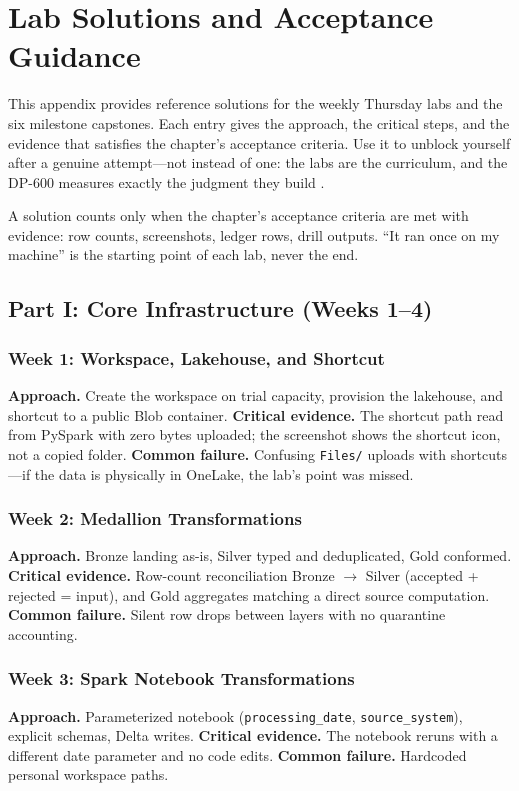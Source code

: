 \chapter{Lab Solutions and Acceptance Guidance}
%
This appendix provides reference solutions for the weekly Thursday labs and the six milestone
capstones. Each entry gives the approach, the critical steps, and the evidence that satisfies the
chapter's acceptance criteria. Use it to unblock yourself after a genuine attempt---not instead
of one: the labs are the curriculum, and the DP-600 measures exactly the judgment they build
\cite{microsoftDp600}.

\begin{notebox}
A solution counts only when the chapter's acceptance criteria are met with evidence: row counts,
screenshots, ledger rows, drill outputs. ``It ran once on my machine'' is the starting point of
each lab, never the end.
\end{notebox}

\section{Part I: Core Infrastructure (Weeks 1--4)}
\subsection{Week 1: Workspace, Lakehouse, and Shortcut}
\textbf{Approach.} Create the workspace on trial capacity, provision the lakehouse, and shortcut
to a public Blob container. \textbf{Critical evidence.} The shortcut path read from PySpark with
zero bytes uploaded; the screenshot shows the shortcut icon, not a copied folder.
\textbf{Common failure.} Confusing \texttt{Files/} uploads with shortcuts---if the data is
physically in OneLake, the lab's point was missed.

\subsection{Week 2: Medallion Transformations}
\textbf{Approach.} Bronze landing as-is, Silver typed and deduplicated, Gold conformed.
\textbf{Critical evidence.} Row-count reconciliation Bronze $\rightarrow$ Silver (accepted +
rejected = input), and Gold aggregates matching a direct source computation.
\textbf{Common failure.} Silent row drops between layers with no quarantine accounting.

\subsection{Week 3: Spark Notebook Transformations}
\textbf{Approach.} Parameterized notebook (\texttt{processing\_date}, \texttt{source\_system}),
explicit schemas, Delta writes. \textbf{Critical evidence.} The notebook reruns with a different
date parameter and no code edits. \textbf{Common failure.} Hardcoded personal workspace paths.

